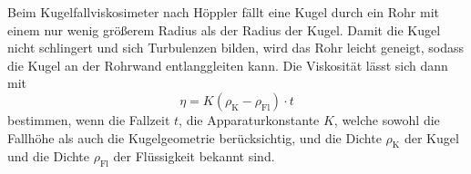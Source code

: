 Beim Kugelfallviskosimeter nach Höppler fällt eine Kugel durch ein Rohr mit einem
nur wenig größerem Radius als der Radius der Kugel. Damit die Kugel nicht
schlingert und sich Turbulenzen bilden, wird das Rohr leicht geneigt, sodass die
Kugel an der Rohrwand entlanggleiten kann. Die Viskosität lässt sich dann mit
\begin{equation}
  \eta = K (\rho_\text{K} - \rho_\text{Fl}) \cdot t
  \label{eqn:bestimmung_eta}
\end{equation}
bestimmen, wenn die Fallzeit $t$, die Apparaturkonstante $K$, welche sowohl die
Fallhöhe als auch die Kugelgeometrie berücksichtig, und die Dichte $\rho_\text{K}$
der Kugel und die Dichte $\rho_\text{Fl}$ der Flüssigkeit bekannt sind.
\cite{sample}
